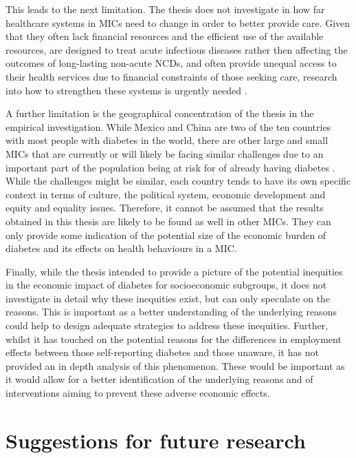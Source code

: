 This leads to the next limitation. The thesis does not investigate in how far healthcare systems in \acp{MIC} need to change in order to better provide care. Given that they often lack financial resources and the efficient use of the available resources, are designed to treat acute infectious diseases rather then affecting the outcomes of long-lasting non-acute \acp{NCD}, and often provide unequal access to their health services due to financial constraints of those seeking care, research into how to strengthen these systems is urgently needed \parencite{Mills2014,Guzman2010}.

A further limitation is the geographical concentration of the thesis in the empirical investigation. While Mexico and China are two of the ten countries with most people with diabetes in the world, there are other large and small \acp{MIC} that are currently or will likely be facing similar challenges due to an important part of the population being at risk for of already having diabetes \parencite{Risk2016}. While the challenges might be similar, each country tends to have its own specific context in terms of culture, the political system, economic development and equity and equality issues. Therefore, it cannot be assumed that the results obtained in this thesis are likely to be found as well in other \acp{MIC}. They can only provide some indication of the potential size of the economic burden of diabetes and its effects on health behaviours in a \ac{MIC}.

Finally, while the thesis intended to provide a picture of the potential inequities in the economic impact of diabetes for socioeconomic subgroups, it does not investigate in detail why these inequities exist, but can only speculate on the reasons. This is important as a better understanding of the underlying reasons could help to design adequate strategies to address these inequities. Further, whilst it has touched on the potential reasons for the differences in employment effects between those self-reporting diabetes and those unaware, it has not provided an in depth analysis of this phenomenon. These would be important as it would allow for a better identification of the underlying reasons and of interventions aiming to prevent these adverse economic effects. 



\section{Suggestions for future research}

